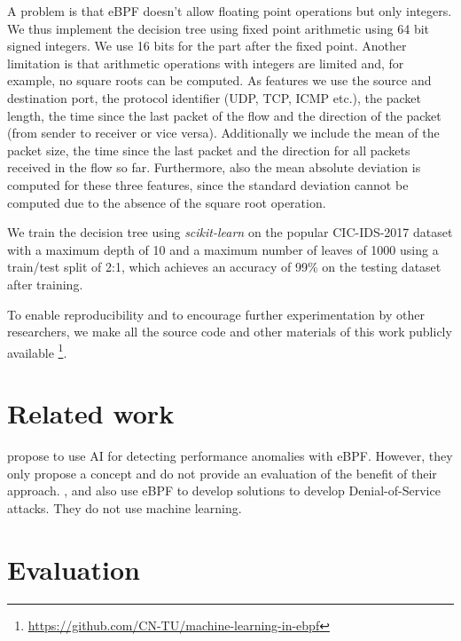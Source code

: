 \documentclass[conference]{IEEEtran}
\begin{document}

A problem is that eBPF doesn't allow floating point operations but only integers. We thus implement the decision tree using fixed point arithmetic using 64 bit signed integers. We use 16 bits for the part after the fixed point. Another limitation is that arithmetic operations with integers are limited and, for example, no square roots can be computed. As features we use the source and destination port, the protocol identifier (UDP, TCP, ICMP etc.), the packet length, the time since the last packet of the flow and the direction of the packet (from sender to receiver or vice versa). Additionally we include the mean of the packet size, the time since the last packet and the direction for all packets received in the flow so far. Furthermore, also the mean absolute deviation is computed for these three features, since the standard deviation cannot be computed due to the absence of the square root operation. 

We train the decision tree using \textit{scikit-learn} on the popular CIC-IDS-2017 dataset \cite{sharafaldin_toward_2018} with a maximum depth of 10 and a maximum number of leaves of 1000 using a train/test split of 2:1, which achieves an accuracy of 99\% on the testing dataset after training. 

To enable reproducibility and to encourage further experimentation by other researchers, we make all the source code and other materials of this work publicly available \footnote{\url{https://github.com/CN-TU/machine-learning-in-ebpf}}.

\section{Related work}

\cite{ben-yair_ai_2019} propose to use AI for detecting performance anomalies with eBPF. However, they only propose a concept and do not provide an evaluation of the benefit of their approach. \cite{demoulin_detecting_2019}, \cite{van_wieren_signature-based_2019} and also \cite{choe_ebpfxdp_2020} use eBPF to develop solutions to develop Denial-of-Service attacks. They do not use machine learning. 

\section{Evaluation}
\end{document}
